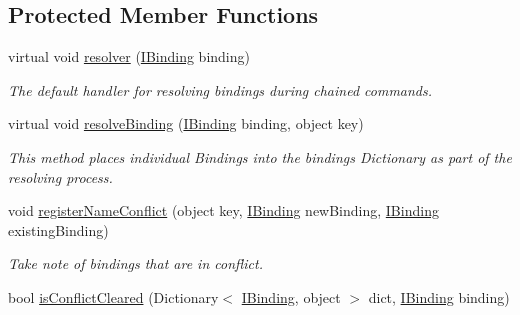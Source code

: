 \subsection*{Protected Member Functions}
\begin{DoxyCompactItemize}
\item 
\hypertarget{classstrange_1_1framework_1_1impl_1_1_binder_a8f463a4edc3e3bbdaac51a8aaa5d240f}{virtual void \hyperlink{classstrange_1_1framework_1_1impl_1_1_binder_a8f463a4edc3e3bbdaac51a8aaa5d240f}{resolver} (\hyperlink{interfacestrange_1_1framework_1_1api_1_1_i_binding}{I\-Binding} binding)}\label{classstrange_1_1framework_1_1impl_1_1_binder_a8f463a4edc3e3bbdaac51a8aaa5d240f}

\begin{DoxyCompactList}\small\item\em The default handler for resolving bindings during chained commands. \end{DoxyCompactList}\item 
virtual void \hyperlink{classstrange_1_1framework_1_1impl_1_1_binder_a376bc9c4030c38eeb12818cc92fdcd5f}{resolve\-Binding} (\hyperlink{interfacestrange_1_1framework_1_1api_1_1_i_binding}{I\-Binding} binding, object key)
\begin{DoxyCompactList}\small\item\em This method places individual Bindings into the bindings Dictionary as part of the resolving process. \end{DoxyCompactList}\item 
void \hyperlink{classstrange_1_1framework_1_1impl_1_1_binder_a6150d8762ded854628d21c5e35489adc}{register\-Name\-Conflict} (object key, \hyperlink{interfacestrange_1_1framework_1_1api_1_1_i_binding}{I\-Binding} new\-Binding, \hyperlink{interfacestrange_1_1framework_1_1api_1_1_i_binding}{I\-Binding} existing\-Binding)
\begin{DoxyCompactList}\small\item\em Take note of bindings that are in conflict. \end{DoxyCompactList}\item 
\hypertarget{classstrange_1_1framework_1_1impl_1_1_binder_a541607fe739b65b5f28b4152bec49a46}{bool \hyperlink{classstrange_1_1framework_1_1impl_1_1_binder_a541607fe739b65b5f28b4152bec49a46}{is\-Conflict\-Cleared} (Dictionary$<$ \hyperlink{interfacestrange_1_1framework_1_1api_1_1_i_binding}{I\-Binding}, object $>$ dict, \hyperlink{interfacestrange_1_1framework_1_1api_1_1_i_binding}{I\-Binding} binding)}\label{classstrange_1_1framework_1_1impl_1_1_binder_a541607fe739b65b5f28b4152bec49a46}


\end{DoxyCompactItemize}
